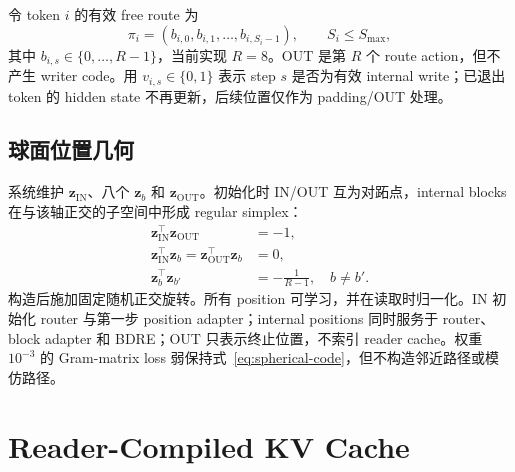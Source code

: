 \documentclass[UTF8,twocolumn,10pt,a4paper]{ctexart}
\newcommand{\BDRE}{\textsf{BDRE}}
\begin{document}
令 token $i$ 的有效 free route 为
\begin{equation}
  \pi_i=(b_{i,0},b_{i,1},\ldots,b_{i,S_i-1}),
  \qquad S_i\le S_{\max},
  \label{eq:route}
\end{equation}
其中 $b_{i,s}\in\{0,\ldots,R-1\}$，当前实现 $R=8$。OUT 是第 $R$ 个 route action，但不产生 writer code。用 $v_{i,s}\in\{0,1\}$ 表示 step $s$ 是否为有效 internal write；已退出 token 的 hidden state 不再更新，后续位置仅作为 padding/OUT 处理。

\subsection{球面位置几何}
系统维护 $\bm z_{\mathrm{IN}}$、八个 $\bm z_b$ 和 $\bm z_{\mathrm{OUT}}$。初始化时 IN/OUT 互为对跖点，internal blocks 在与该轴正交的子空间中形成 regular simplex：
\begin{align}
  \bm z_{\mathrm{IN}}^\top\bm z_{\mathrm{OUT}}&=-1,\\
  \bm z_{\mathrm{IN}}^\top\bm z_b
  =\bm z_{\mathrm{OUT}}^\top\bm z_b&=0,\\
  \bm z_b^\top\bm z_{b'}&=-\frac{1}{R-1},\quad b\ne b'.
  \label{eq:spherical-code}
\end{align}
构造后施加固定随机正交旋转。所有 position 可学习，并在读取时归一化。IN 初始化 router 与第一步 position adapter；internal positions 同时服务于 router、block adapter 和 \BDRE{}；OUT 只表示终止位置，不索引 reader cache。权重 $10^{-3}$ 的 Gram-matrix loss 弱保持式~\eqref{eq:spherical-code}，但不构造邻近路径或模仿路径。

\section{Reader-Compiled KV Cache}
\end{document}

